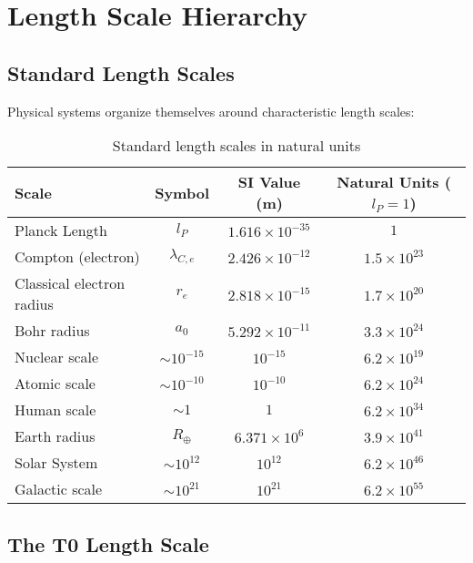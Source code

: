 \documentclass[11pt,a4paper]{article}
\begin{document}
	\section{Length Scale Hierarchy}
	
	\subsection{Standard Length Scales}
	
	Physical systems organize themselves around characteristic length scales:
	
	\begin{table}[htbp]
		\centering
		\begin{adjustbox}{width=0.95\textwidth}
			\begin{tabular}{lccc}
				\toprule
				\textbf{Scale} & \textbf{Symbol} & \textbf{SI Value (m)} & \textbf{Natural Units ($l_P = 1$)} \\
				\midrule
				Planck Length & $l_P$ & $1.616 \times 10^{-35}$ & $1$ \\
				Compton (electron) & $\lambda_{C,e}$ & $2.426 \times 10^{-12}$ & $1.5 \times 10^{23}$ \\
				Classical electron radius & $r_e$ & $2.818 \times 10^{-15}$ & $1.7 \times 10^{20}$ \\
				Bohr radius & $a_0$ & $5.292 \times 10^{-11}$ & $3.3 \times 10^{24}$ \\
				Nuclear scale & $\sim 10^{-15}$ & $10^{-15}$ & $6.2 \times 10^{19}$ \\
				Atomic scale & $\sim 10^{-10}$ & $10^{-10}$ & $6.2 \times 10^{24}$ \\
				Human scale & $\sim 1$ & $1$ & $6.2 \times 10^{34}$ \\
				Earth radius & $R_\oplus$ & $6.371 \times 10^6$ & $3.9 \times 10^{41}$ \\
				Solar System & $\sim 10^{12}$ & $10^{12}$ & $6.2 \times 10^{46}$ \\
				Galactic scale & $\sim 10^{21}$ & $10^{21}$ & $6.2 \times 10^{55}$ \\
				\bottomrule
			\end{tabular}
		\end{adjustbox}
		\caption{Standard length scales in natural units}
		\label{tab:length_scales}
	\end{table}
	
	\subsection{The T0 Length Scale}
	
\end{document}

